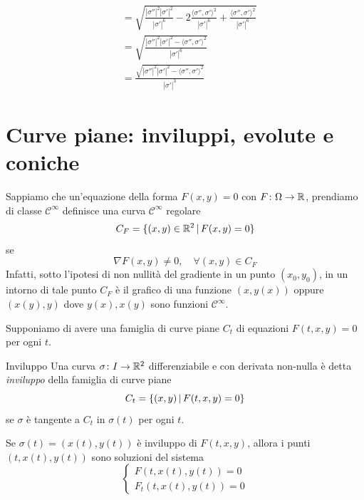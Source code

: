 \documentclass[a4paper]{article}
\begin{document}
\begin{snippetproof}{}
\begin{align*}
        &= \sqrt{
            \frac{|\sigma''|^2 |\sigma'|^2}{|\sigma'|^6} 
            - 2 \frac{\langle \sigma'', \sigma'\rangle^2}{|\sigma'|^6} 
            + \frac{\langle \sigma'', \sigma'\rangle^2}{|\sigma'|^6}
        } \\
        &= \sqrt{
            \frac{
                |\sigma''|^2 |\sigma'|^2 - \langle \sigma'', \sigma'\rangle^2
            }{
                |\sigma'|^6
            }
        } \\
        &= \frac{
            \sqrt{|\sigma''|^2 |\sigma'|^2 - \langle \sigma'', \sigma'\rangle^2}
        }{
            |\sigma'|^3
        }
    \end{align*}
\end{snippetproof}

\section{Curve piane: inviluppi, evolute e coniche}

Sappiamo che un'equazione della forma \(F(x,y) = 0\)
con \(F \colon \Omega \to \mathbb{R}\),
prendiamo di classe \(\mathcal C^\infty\) definisce una curva
\(\mathcal C^\infty\) regolare
\[
    C_F = \{(x,y) \in \mathbb{R}^2 \,|\, F(x,y) = 0\}
\]
se \[
    \nabla F(x,y) \neq 0, \quad \forall (x,y) \in C_F
\]
Infatti, sotto l'ipotesi di non nullità del gradiente in un punto \((x_0, y_0)\),
in un intorno di tale punto \(C_F\) è il grafico di una funzione \((x, y(x))\)
oppure \((x(y), y)\) dove \(y(x), x(y)\) sono funzioni \(\mathcal C^\infty\).

Supponiamo di avere una famiglia di curve piane
\(C_t\) di equazioni \(F(t,x,y) = 0\) per ogni \(t\).

\begin{radioactive}
\begin{snippetdefinition}{Inviluppo}
    Una curva \(\sigma \colon I \to \mathbb{R}^2\) differenziabile
    e con derivata non-nulla
    è detta \emph{inviluppo} della famiglia di curve piane
    \[
        C_t = \{(x,y) \,|\, F(t, x,y) = 0\}
    \]
    se \(\sigma\) è tangente a \(C_t\) in \(\sigma(t)\)
    per ogni \(t\).
\end{snippetdefinition}
\end{radioactive}

\begin{radioactive}
\begin{snippetproposition}{}
    Se \(\sigma(t) = (x(t), y(t))\) è inviluppo di \(F(t,x,y)\),
    allora i punti \((t,x(t), y(t))\) sono soluzioni del sistema 
    \[
        \begin{cases}
            F(t,x(t), y(t)) = 0 \\
            F_t(t, x(t), y(t)) = 0
        \end{cases}
    \]
\end{snippetproposition}
\end{radioactive}
\end{document}
